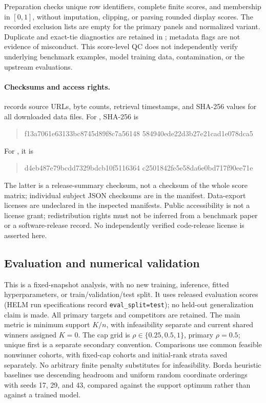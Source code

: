 Preparation checks unique row identifiers, complete finite scores, and membership in $[0,1]$, without imputation, clipping, or parsing rounded display scores. The recorded exclusion lists are empty for the primary panels and normalized variant. Duplicate and exact-tie diagnostics are retained in ; metadata flags are not evidence of misconduct. This score-level QC does not independently verify underlying benchmark examples, model training data, contamination, or the upstream evaluations.

\paragraph{Checksums and access rights.}
 records source URLs, byte counts, retrieval timestamps, and SHA-256 values for all downloaded data files. For , SHA-256 is
\begin{quote}\small\ttfamily
f13a7061e63133bc8745d89f8c7a56148\allowbreak{}%
584940ede22d3b27e21cad1e078dca5
\end{quote}
For , it is
\begin{quote}\small\ttfamily
d4eb487e79bcdd7329bdcb10f5116364\allowbreak{}%
c2501842fe5e58da6e0bd717f90ee71e
\end{quote}
The latter is a release-summary checksum, not a checksum of the whole score matrix; individual subject JSON checksums are in the manifest. Data-export licenses are undeclared in the inspected manifests. Public accessibility is not a license grant; redistribution rights must not be inferred from a benchmark paper or a software-release record. No independently verified code-release license is asserted here.

\subsection{Evaluation and numerical validation}
\label{app:validation}
This is a fixed-snapshot analysis, with no new training, inference, fitted hyperparameters, or train/validation/test split. It uses released evaluation scores (HELM run specifications record \texttt{eval\_split=test}); no held-out generalization claim is made. All primary targets and competitors are retained. The main metric is minimum support $K/n$, with infeasibility separate and current shared winners assigned $K=0$. The cap grid is $\rho\in\{0.25,0.5,1\}$, primary $\rho=0.5$; unique first is a separate secondary convention. Comparisons use common feasible nonwinner cohorts, with fixed-cap cohorts and initial-rank strata saved separately. No arbitrary finite penalty substitutes for infeasibility. Borda heuristic baselines use descending headroom and uniform random coordinate orderings with seeds 17, 29, and 43, compared against the support optimum rather than against a trained model.

